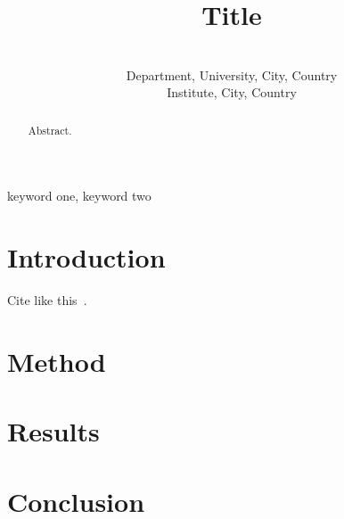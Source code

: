 \documentclass[wcp]{jmlr}
\title[Short title]{Title}
\author{\Name{Author One} \Email{one@example.edu}\\ \addr Department, University, City, Country
\AND \Name{Author Two} \Email{two@example.edu}\\ \addr Institute, City, Country}
\begin{document}
\maketitle
\begin{abstract}
Abstract.
\end{abstract}
\begin{keywords}
keyword one, keyword two
\end{keywords}
\section{Introduction}
Cite like this~\cite{example2026}.
\section{Method}
\section{Results}
\section{Conclusion}

\end{document}
